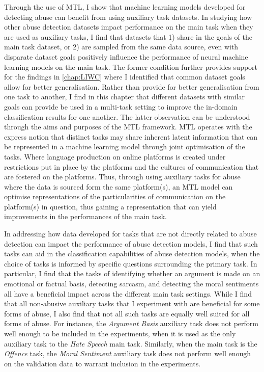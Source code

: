Through the use of MTL, I show that machine learning models developed for detecting abuse can benefit from using auxiliary task datasets.
In studying  how other abuse detection datasets impact performance on the main task when they are used as auxiliary tasks, I find that datasets that 1) share in the goals of the main task dataset, or 2) are sampled from the same data source, even with disparate dataset goals positively influence the performance of neural machine learning models on the main task.
The former condition further provides support for the findings in \cref{chap:LIWC} where I identified that common dataset goals allow for better generalisation.
Rather than provide for better generalisation from one task to another, I find in this chapter that different datasets with similar goals can provide be used in a multi-task setting to improve the in-domain classification results for one another.
The latter observation can be understood through the aims and purposes of the MTL framework.
MTL operates with the express notion that distinct tasks may share inherent latent information that can be represented in a machine learning model through joint optimisation of the tasks.
Where language production on online platforms is created under restrictions put in place by the platforms and the cultures of communication that are fostered on the platforms.
Thus, through using auxiliary tasks for abuse where the data is sourced form the same platform(s), an MTL model can optimise representations of the particularities of communication on the platform(s) in question, thus gaining a representation that can yield improvements in the performances of the main task.

In addressing  how data developed for tasks that are not directly related to abuse detection can impact the performance of abuse detection models, I find that such tasks can aid in the classification capabilities of abuse detection models, when the choice of tasks is informed by specific questions surrounding the primary task.
In particular, I find that the tasks of identifying whether an argument is made on an emotional or factual basis, detecting sarcasm, and detecting the moral sentiments all have a beneficial impact across the different main task settings.
While I find that all non-abusive auxiliary tasks that I experiment with are beneficial for some forms of abuse, I also find that not all such tasks are equally well suited for all forms of abuse.
For instance, the \textit{Argument Basis} auxiliary task does not perform well enough to be included in the experiments, when it is used as the only auxiliary task to the \textit{Hate Speech} main task.
Similarly, when the main task is the \textit{Offence} task, the \textit{Moral Sentiment} auxiliary task does not perform well enough on the validation data to warrant inclusion in the experiments.


